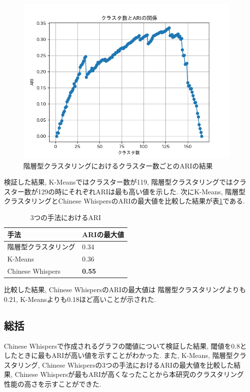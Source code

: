 \begin{figure}[H]
  \centering
  \includegraphics[scale=0.8]
    {contents/images/agg_graph.png}
  \caption{階層型クラスタリングにおけるクラスター数ごとのARIの結果\label{fig:agg_graph}}
\end{figure}

検証した結果, K-Meansではクラスター数が119, 階層型クラスタリングではクラスター数が129の時にそれぞれARIは最も高い値を示した. 次にK-Means, 階層型クラスタリングとChinese WhispersのARIの最大値を比較した結果が表\ref{tb:two_ari}である. 

\begin{table}[H]
  \caption{3つの手法におけるARI}
  \label{tb:two_ari}
  \begin{center}
  \begin{tabularx}{\linewidth}{X|X}
    \hline
    手法&ARIの最大値\\\hline\hline
    階層型クラスタリング&0.34\\\hline
    K-Means&0.36\\\hline
    Chinese Whispers&\textbf{0.55}\\\hline
  \end{tabularx}\end{center}
\end{table}

比較した結果, Chinese WhispersのARIの最大値は 階層型クラスタリングよりも0.21, K-Meansよりも0.18ほど高いことが示された. 

\subsection{総括}
Chinese Whispersで作成されるグラフの閾値について検証した結果, 閾値を0.8としたときに最もARIが高い値を示すことがわかった. 
また, K-Means, 階層型クラスタリング, Chinese Whispersの3つの手法におけるARIの最大値を比較した結果, Chinese Whispersが最もARIが高くなったことから本研究のクラスタリング性能の高さを示すことができた. 

